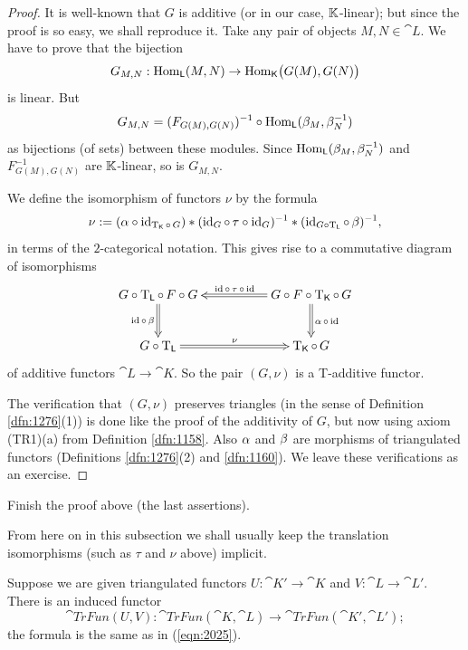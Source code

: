 \begin{proof}
It is well-known that $G$ is additive (or in our case, $\mathbb{K}$-linear); but 
since 
the proof is so easy, we shall reproduce it. Take any pair of objects 
$M, N \in \cat{L}$. We have to prove that the bijection
\[ G_{M, N} : \operatorname{Hom}_{\operatorname{\mathsf{L}}}(M, N) \to 
\operatorname{Hom}_{\operatorname{\mathsf{K}}} \bigl( G(M), G(N) \bigr) \]
is linear. But 
\[ G_{M, N} = (F_{G(M), G(N)})^{-1} \circ
\operatorname{Hom}_{\operatorname{\mathsf{L}}}(\beta_M, \beta_N^{-1}) \]
as bijections (of sets) between these modules. Since 
$\operatorname{Hom}_{\operatorname{\mathsf{L}}}(\beta_M, \beta_N^{-1})$
and $F^{-1}_{G(M), G(N)}$ are $\mathbb{K}$-linear, so is $G_{M, N}$.

We define the isomorphism of functors $\nu$ by the formula 
\[ \nu := (\alpha \circ \operatorname{id}_{\operatorname{T}_{\operatorname{\mathsf{K}}} \circ \, G}) * 
(\operatorname{id}_G \circ \, \tau \circ \operatorname{id}_G)^{-1} * 
(\operatorname{id}_{G \circ \operatorname{T}_{\operatorname{\mathsf{L}}}} \circ \, \beta)^{-1} , \]
in terms of the $2$-categorical notation.
This gives rise to a commutative diagram of isomorphisms
\[ \UseTips \xymatrix @C=12ex @R=6ex { 
G \circ \opn{T}_{\cat{L}} \circ \, F \circ G
\ar@{=>}[d]_{\opn{id} \circ \, \be}
& 
G \circ F \circ \opn{T}_{\cat{K}} \circ \, G
\ar@{=>}[l]_{\opn{id} \circ \, \tau \, \circ \, \opn{id}}
\ar@{=>}[d]^{\al \, \circ \, \opn{id}}
\\
G \circ \opn{T}_{\cat{L}}
\ar@{=>}[r]^{\nu}
&
\opn{T}_{\cat{K}} \circ \, G
} \]
of additive functors $\cat{L} \to \cat{K}$. 
So the pair $(G, \nu)$ is a T-additive functor. 

The verification that $(G, \nu)$ preserves triangles (in the sense of 
Definition \ref{dfn:1276}(1)) is done like the proof of the additivity of 
$G$, but now using axiom (TR1)(a) from Definition \ref{dfn:1158}.
Also $\alpha$ and $\beta$ are morphisms of triangulated functors 
(Definitions \ref{dfn:1276}(2) and \ref{dfn:1160}). 
We leave these verifications as an exercise. 
\end{proof}

\begin{exer}
Finish the proof above (the last assertions).  
\end{exer}

From here on in this subsection we shall usually keep the translation 
isomorphisms (such as $\tau$ and $\nu$ above) implicit. 

Suppose we are given triangulated functors 
$U : \cat{K}' \to \cat{K}$ and 
$V : \cat{L} \to \cat{L}'$. There is an induced functor 
\[ \cat{TrFun}(U, V) : 
\cat{TrFun}(\cat{K}, \cat{L}) \to \cat{TrFun}(\cat{K}', \cat{L}') ; \]
the formula is the same as in (\ref{eqn:2025}). 

